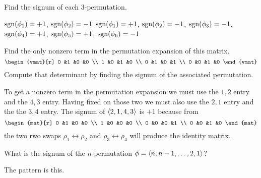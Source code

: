 \begin{exercises}
\begin{exparts}
      \partsitem Find the signum of each $3$-permutation.
    \end{exparts}
    \begin{answer}
      \begin{exparts}
        \partsitem \( \operatorname{sgn}(\phi_1)=+1 \), \( \operatorname{sgn}(\phi_2)=-1 \)
        \partsitem \( \operatorname{sgn}(\phi_1)=+1 \), \( \operatorname{sgn}(\phi_2)=-1 \),
              \( \operatorname{sgn}(\phi_3)=-1 \), \( \operatorname{sgn}(\phi_4)=+1 \),
              \( \operatorname{sgn}(\phi_5)=+1 \), \( \operatorname{sgn}(\phi_6)=-1 \)
      \end{exparts}  
     \end{answer}
  \item 
    Find the only nonzero term in the permutation expansion of
    this matrix.
    \begin{equation*}
      \begin{vmat}[r]
        0  &1  &0  &0  \\
        1  &0  &1  &0  \\
        0  &1  &0  &1  \\
        0  &0  &1  &0
      \end{vmat}
    \end{equation*}
    Compute that determinant by finding the signum of the associated
    permutation.
    \begin{answer}
      To get a nonzero term in the permutation expansion we must use
      the \( 1,2 \) entry and the \( 4,3 \) entry.
      Having fixed on those two we must also use the \( 2,1 \) entry and
      the the \( 3,4 \) entry.
      The signum of \( \langle2,1,4,3\rangle \) is \( +1 \) because from
      \begin{equation*}
        \begin{mat}[r]
          0  &1  &0  &0  \\
          1  &0  &0  &0  \\
          0  &0  &0  &1  \\
          0  &0  &1  &0            
        \end{mat}
      \end{equation*}
      the two rwo swaps $\rho_1\leftrightarrow\rho_2$ and 
      $\rho_3\leftrightarrow\rho_4$ will produce the identity matrix.  
    \end{answer}
  \item  
    \cite{Strang}
    What is the signum of the $n$-permutation
    \( \phi=\langle n,n-1,\dots,2,1\rangle \)?
    \begin{answer}
      The pattern is this.
      \begin{center}

\end{center}
\end{answer}
\end{exercises}
